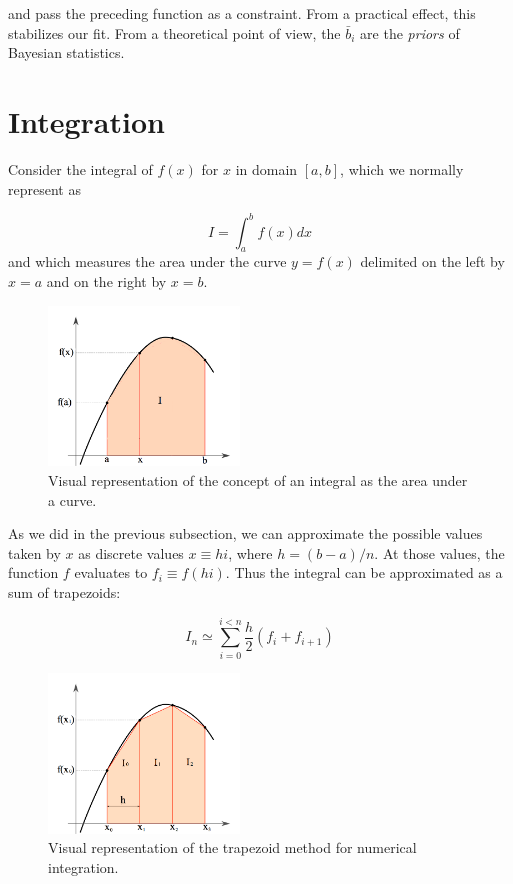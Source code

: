 \documentclass[justified,sixbynine]{tufte-book}
\theoremstyle{plain}%
\theoremstyle{definition}
\theoremstyle{remark}
\begin{document}
\begin{fullwidth}
and pass the preceding function as a constraint.
From a practical effect, this stabilizes our fit. From a theoretical point of view, the $\bar b_i$ are the {\it priors} of Bayesian statistics.

\goodbreak\section{Integration}


Consider the integral of $f(x)$ for $x$ in domain $[a,b]$, which we normally represent as

\begin{equation}
I = \int_a^b f(x)dx
\end{equation}
 and which measures the area under the curve $y=f(x)$ delimited on the left by $x=a$ and on the right by $x=b$.

\begin{figure}[ht]
\centering\includegraphics[width=2in]{images/integral1.png}
\caption{Visual representation of the concept of an integral as the area under a curve.}
\end{figure}

As we did in the previous subsection, we can approximate the possible values taken by $x$ as discrete values $x\equiv h i$, where $h=(b-a)/n$. At those values, the function $f$ evaluates to $f_i \equiv f(h i)$. Thus the integral can be approximated as a sum of trapezoids:

\begin{equation}
  I_n \simeq \sum_{i=0}^{i<n} \frac{h}{2}(f_i+f_{i+1})
\end{equation}

\begin{figure}[ht]
\centering\includegraphics[width=2in]{images/integral2.png}
\caption{Visual representation of the trapezoid method for numerical integration.}
\end{figure}


\end{fullwidth}
\end{document}
